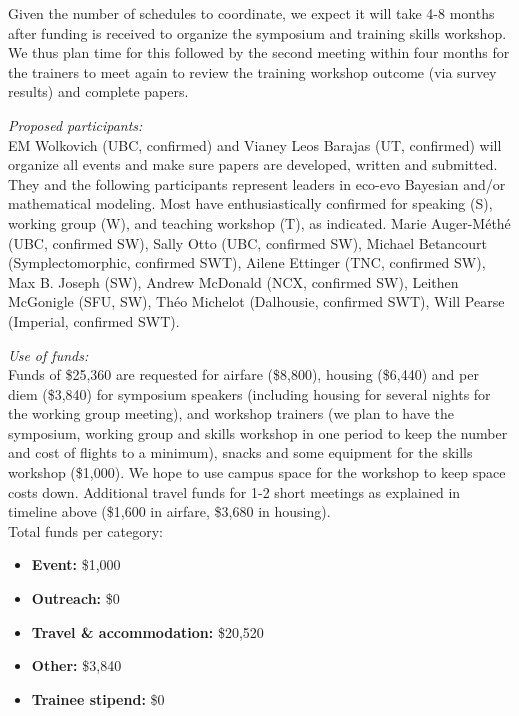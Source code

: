 \documentclass[11pt,letter]{article}
\begin{document}
Given the number of schedules to coordinate, we expect it will take 4-8 months after funding is received to organize the symposium and training skills workshop. We thus plan time for this followed by the second meeting within four months for the trainers to meet again to review the training workshop outcome (via survey results) and complete papers.

\emph{Proposed participants:} \\
EM Wolkovich (UBC, confirmed) and Vianey Leos Barajas (UT, confirmed) will organize all events and make sure papers are developed, written and submitted. They and the following participants represent leaders in eco-evo Bayesian and/or mathematical modeling. Most have enthusiastically confirmed for speaking (S), working group (W), and teaching workshop (T), as indicated. Marie Auger-M\'{e}th\'{e} (UBC, confirmed SW), Sally Otto (UBC, confirmed SW), Michael Betancourt (Symplectomorphic, confirmed SWT), Ailene Ettinger (TNC, confirmed SW), Max B. Joseph (SW), Andrew McDonald (NCX, confirmed SW), Leithen McGonigle (SFU, SW), Th\'{e}o Michelot (Dalhousie, confirmed SWT), Will Pearse (Imperial, confirmed SWT). %

\emph{Use of funds:} \\
Funds of \$25,360 are requested for airfare (\$8,800), housing (\$6,440) and per diem (\$3,840) for symposium speakers (including housing for several nights for the working group meeting), and workshop trainers (we plan to have the symposium, working group and skills workshop in one period to keep the number and cost of flights to a minimum), snacks and some equipment for the skills workshop (\$1,000). We hope to use campus space for the workshop to keep space costs down. Additional travel funds for 1-2 short meetings as explained in timeline above (\$1,600 in airfare, \$3,680 in housing). \\

Total funds per category:
\begin{itemize}
\item {\bf Event:} \$1,000
\item {\bf Outreach:} \$0
\item {\bf Travel \& accommodation:} \$20,520
\item {\bf Other:} \$3,840
\item {\bf Trainee stipend:} \$0
\end{itemize}
\end{document}
